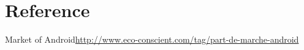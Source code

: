 \section{Reference}

Market of Android\url{http://www.eco-conscient.com/tag/part-de-marche-android}
